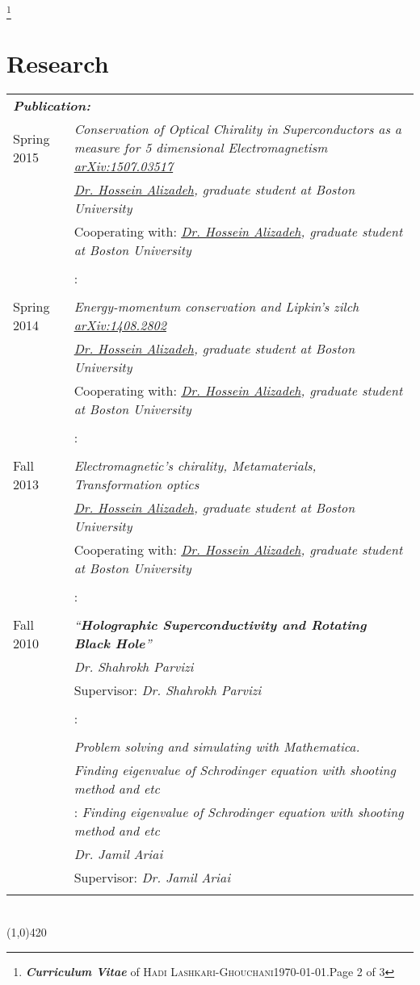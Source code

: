 \documentclass[10pt]{article}
\newcommand{\maxpages}{3}
\newcommand{\maxpages}{3}
\newcommand\HRule{\hspace*{.8cm}\line(1,0){420}\\}
\newenvironment{Record}[1]
{
    \vspace{-0.35cm}
    \section*{#1}
        \vspace{0.1cm}
        \begin{tabular}
}
{
        \end{tabular}\\
        \HRule
}
\newcommand{\FootNote}[1]{\let\thefootnote\relax\footnote{\textbf{\textit{Curriculum Vitae}} of \textsc{Hadi Lashkari-Ghouchani}\qquad\today.\qquad Page #1 of \maxpages}}
\begin{document}

\FootNote{2}


\newcommand{\Research}[7]{
    \multicolumn{2}{l}{\textbf{\textsl{ #1:}}}\\
    \quad#2&\textit{#3}\\
    \ifthenelse{\isempty{#4}}
    {&\textit{#5}\\}
    {&#4: \textit{#5}\\}
    \ifthenelse{\isempty{#6}}
    {&\textit{#7}\\}
    {&#6: \textit{#7}\\}%
}

\begin{Record}{Research}{l p{11cm}}
    \Research{Publication}
        {Spring 2015}
        {Conservation of Optical Chirality in Superconductors as a measure for 5 dimensional Electromagnetism \href{http://arxiv.org/abs/1507.03517}{arXiv:1507.03517}}
        {Cooperating with}
        {\href{http://physics.bu.edu/people/show/halizade}{Dr. Hossein Alizadeh}, graduate student at Boston University}
        {}{}%
    \Research{Publication}
        {Spring 2014}
        {Energy-momentum conservation and Lipkin’s zilch \href{http://arxiv.org/abs/1408.2802}{arXiv:1408.2802}}
        {Cooperating with}
        {\href{http://physics.bu.edu/people/show/halizade}{Dr. Hossein Alizadeh}, graduate student at Boston University}
        {}{}%
    \Research{Independent Research}
        {Fall 2013}
        {Electromagnetic's chirality, Metamaterials, Transformation optics}
        {Cooperating with}
        {\href{http://physics.bu.edu/people/show/halizade}{Dr. Hossein Alizadeh}, graduate student at Boston University}
        {}{}%
    \Research{M.Sc thesis}
        {Fall 2010}
        {``\textbf{Holographic Superconductivity and Rotating Black Hole}''}
        {Supervisor}
        {Dr. Shahrokh Parvizi}
        {}{}%
    \Research{B.Sc projects}
        {}
        {Problem solving and simulating with Mathematica.}
        {}
        {Finding eigenvalue of Schrodinger equation with shooting method and etc}
        {Supervisor}
        {Dr. Jamil Ariai}%

\end{Record}
\end{document}
